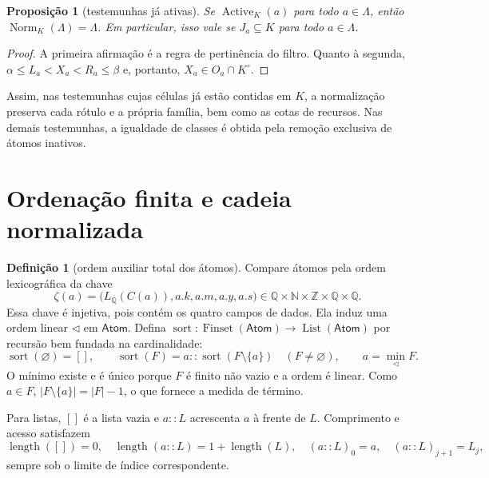 \documentclass[12pt,a4paper]{article}
\theoremstyle{preciso}
\newtheorem{proposicao}[teorema]{Proposição}
\theoremstyle{definition}
\newtheorem{definicao}[teorema]{Definição}
\newcommand{\N}{\mathbb N}
\newcommand{\Z}{\mathbb Z}
\newcommand{\Q}{\mathbb Q}
\newcommand{\Atoms}{\mathsf{Atom}}
\newcommand{\FS}{\operatorname{Finset}}
\newcommand{\Norm}{\operatorname{Norm}}
\newcommand{\Act}{\operatorname{Active}}
\newcommand{\List}{\operatorname{List}}
\theoremstyle{preciso}
\theoremstyle{preciso}
\theoremstyle{preciso}
\theoremstyle{preciso}
\theoremstyle{definition}
\theoremstyle{preciso}
\theoremstyle{definition}
\theoremstyle{preciso}
\theoremstyle{preciso}
\theoremstyle{definition}
\begin{document}
\begin{proposicao}[testemunhas já ativas]\label{map:normalizacao:6.5}\label{normalizacao:prop:fixed}
Se $\Act_K(a)$ para todo $a\in\Lambda$, então
$\Norm_K(\Lambda)=\Lambda$. Em particular, isso vale se
$J_a\subseteq K$ para todo $a\in\Lambda$.
\end{proposicao}
\begin{proof}
A primeira afirmação é a regra de pertinência do filtro. Quanto à
segunda, $\alpha\le L_a<X_a<R_a\le\beta$ e, portanto,
$X_a\in O_a\cap K^\circ$.
\end{proof}

Assim, nas testemunhas cujas células já estão contidas em $K$, a
normalização preserva cada rótulo e a própria família, bem como as
cotas de recursos. Nas demais testemunhas, a igualdade de classes
é obtida pela remoção exclusiva de átomos inativos.

\section{Ordenação finita e cadeia normalizada}
\label{normalizacao:sec:chain}

\begin{definicao}[ordem auxiliar total dos átomos]\label{map:normalizacao:7.1}\label{normalizacao:def:sort}
Compare átomos pela ordem lexicográfica da chave
\[
 \zeta(a)=\bigl(L_\Q(C(a)),a.k,a.m,a.y,a.s\bigr)
          \in\Q\times\N\times\Z\times\Q\times\Q.
\]
Essa chave é injetiva, pois contém os quatro campos de dados.
Ela induz uma ordem linear $\triangleleft$ em $\Atoms$.
Defina $\operatorname{sort}:\FS(\Atoms)\to\List(\Atoms)$ por
recursão bem fundada na cardinalidade:
\[
 \operatorname{sort}(\varnothing)=[],\qquad
 \operatorname{sort}(F)=a::\operatorname{sort}(F\setminus\{a\})
       \quad(F\ne\varnothing),
 \qquad a=\min_{\triangleleft}F.
\]
O mínimo existe e é único porque $F$ é finito não vazio e a ordem
é linear. Como $a\in F$,
$|F\setminus\{a\}|=|F|-1$, o que fornece a medida de término.

Para listas, $[]$ é a lista vazia e $a::L$ acrescenta $a$ à frente
de $L$. Comprimento e acesso satisfazem
\[
 \operatorname{length}([])=0,\quad
 \operatorname{length}(a::L)=1+\operatorname{length}(L),\quad
 (a::L)_0=a,\quad (a::L)_{j+1}=L_j,
\]
sempre sob o limite de índice correspondente.
\end{definicao}
\end{document}
